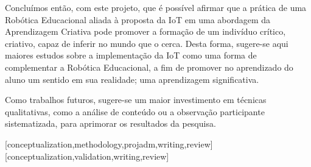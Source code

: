 \documentclass[portuguese]{textolivre}
\begin{document}
Concluímos então, com este projeto, que é possível afirmar que a prática de uma Robótica Educacional aliada à proposta da IoT em uma abordagem da Aprendizagem Criativa pode promover a formação de um indivíduo crítico, criativo, capaz de inferir no mundo que o cerca. Desta forma, sugere-se aqui maiores estudos sobre a implementação da IoT como uma forma de complementar a Robótica Educacional, a fim de promover no aprendizado do aluno um sentido em sua realidade; uma aprendizagem significativa. 

Como trabalhos futuros, sugere-se um maior investimento em técnicas qualitativas, como a análise de conteúdo ou a observação participante sistematizada, para aprimorar os resultados da pesquisa.

\printbibliography\label{sec-bib}

\begin{contributors}
[conceptualization,methodology,projadm,writing,review]
[conceptualization,validation,writing,review]
\end{contributors}

\begin{dataavailability}
\end{dataavailability}
\end{document}
